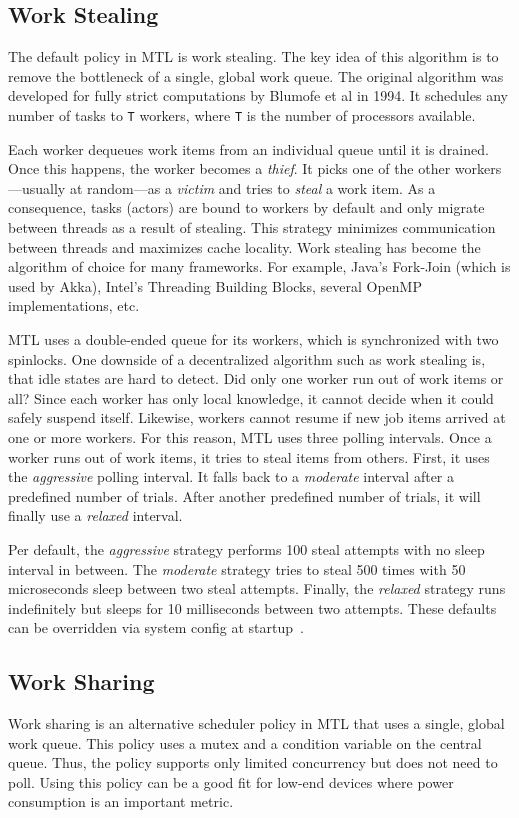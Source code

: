 \subsection{Work Stealing}
\label{work-stealing}

The default policy in MTL is work stealing. The key idea of this algorithm is
to remove the bottleneck of a single, global work queue.  The original
algorithm was developed for fully strict computations by Blumofe et al in 1994.
It schedules any number of tasks to \lstinline^T^ workers, where \lstinline^T^
is the number of processors available.


Each worker dequeues work items from an individual queue until it is drained.
Once this happens, the worker becomes a \emph{thief}. It picks one of the other
workers---usually at random---as a \emph{victim} and tries to \emph{steal} a
work item. As a consequence, tasks (actors) are bound to workers by default and
only migrate between threads as a result of stealing. This strategy minimizes
communication between threads and maximizes cache locality. Work stealing has
become the algorithm of choice for many frameworks. For example, Java's
Fork-Join (which is used by Akka), Intel's Threading Building Blocks, several
OpenMP implementations, etc.

MTL uses a double-ended queue for its workers, which is synchronized with two
spinlocks. One downside of a decentralized algorithm such as work stealing is,
that idle states are hard to detect. Did only one worker run out of work items
or all? Since each worker has only local knowledge, it cannot decide when it
could safely suspend itself. Likewise, workers cannot resume if new job items
arrived at one or more workers. For this reason, MTL uses three polling
intervals. Once a worker runs out of work items, it tries to steal items from
others. First, it uses the \emph{aggressive} polling interval. It falls back to
a \emph{moderate} interval after a predefined number of trials. After another
predefined number of trials, it will finally use a \emph{relaxed} interval.

Per default, the \emph{aggressive} strategy performs 100 steal attempts with no
sleep interval in between. The \emph{moderate} strategy tries to steal 500
times with 50 microseconds sleep between two steal attempts. Finally, the
\emph{relaxed} strategy runs indefinitely but sleeps for 10 milliseconds
between two attempts. These defaults can be overridden via system config at
startup~.

\subsection{Work Sharing}
\label{work-sharing}

Work sharing is an alternative scheduler policy in MTL that uses a single,
global work queue. This policy uses a mutex and a condition variable on the
central queue. Thus, the policy supports only limited concurrency but does not
need to poll. Using this policy can be a good fit for low-end devices where
power consumption is an important metric.

